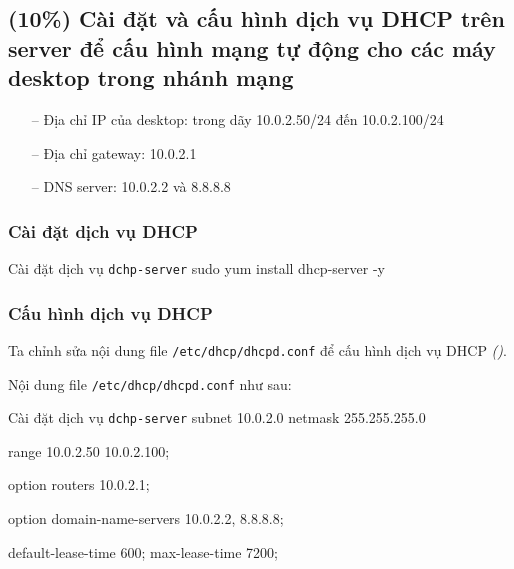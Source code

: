 \subsection{(10\%) Cài đặt và cấu hình dịch vụ DHCP trên server để cấu hình mạng tự động
  cho các máy desktop trong nhánh mạng}

\begin{itemize}
  \item[--] Địa chỉ IP của desktop: trong dãy 10.0.2.50/24 đến 10.0.2.100/24
  \item[--] Địa chỉ gateway:  10.0.2.1
  \item[--] DNS server: 10.0.2.2 và 8.8.8.8
\end{itemize}

\subsubsection{Cài đặt dịch vụ DHCP}

\vspace{0.5cm}
\begin{coding}{Cài đặt dịch vụ \texttt{dchp-server}}
  sudo yum install dhcp-server -y
\end{coding}

\subsubsection{Cấu hình dịch vụ DHCP}

Ta chỉnh sửa nội dung file \texttt{/etc/dhcp/dhcpd.conf} để cấu hình dịch vụ DHCP
\textit{()}.


Nội dung file \texttt{/etc/dhcp/dhcpd.conf} như sau:

\vspace{0.5cm}
\begin{coding}{Cài đặt dịch vụ \texttt{dchp-server}}
  subnet 10.0.2.0 netmask 255.255.255.0 {
      range 10.0.2.50 10.0.2.100;

      option routers 10.0.2.1;

      option domain-name-servers 10.0.2.2, 8.8.8.8;

      default-lease-time 600;
      max-lease-time 7200;
    }
\end{coding}

